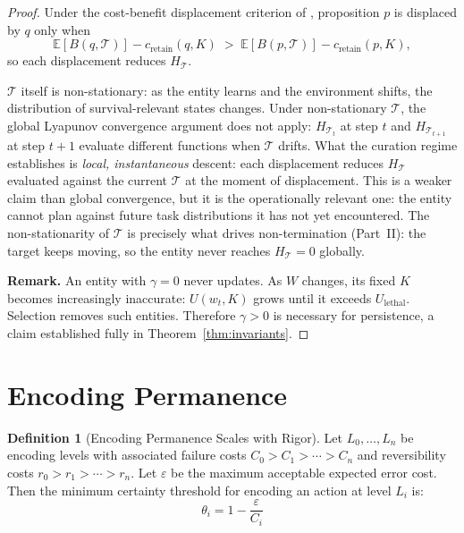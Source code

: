 \documentclass[11pt]{article}
\theoremstyle{definition}
\newtheorem{definition}{Definition}
\theoremstyle{remark}
\begin{document}
\begin{proof}
Under the cost-benefit displacement criterion of \cite{McCarthy2026c},
proposition $p$ is displaced by $q$ only when
\[
  \mathbb{E}[B(q, \mathcal{T})] - c_{\text{retain}}(q, K)
  \;>\;
  \mathbb{E}[B(p, \mathcal{T})] - c_{\text{retain}}(p, K),
\]
so each displacement reduces $H_{\mathcal{T}}$.

$\mathcal{T}$ itself is non-stationary: as the entity learns and the
environment shifts, the distribution of survival-relevant states
changes. Under non-stationary $\mathcal{T}$, the global Lyapunov
convergence argument does not apply: $H_{\mathcal{T}_t}$ at step $t$
and $H_{\mathcal{T}_{t+1}}$ at step $t+1$ evaluate different functions
when $\mathcal{T}$ drifts. What the curation regime establishes is
\emph{local, instantaneous} descent: each displacement reduces
$H_{\mathcal{T}}$ evaluated against the current $\mathcal{T}$ at the
moment of displacement. This is a weaker claim than global
convergence, but it is the operationally relevant one: the entity
cannot plan against future task distributions it has not yet
encountered. The non-stationarity of $\mathcal{T}$ is precisely what
drives non-termination (Part~II): the target keeps moving, so the
entity never reaches $H_{\mathcal{T}} = 0$ globally.

\textbf{Remark.} An entity with $\gamma = 0$ never updates. As $W$
changes, its fixed $K$ becomes increasingly inaccurate: $U(w_t, K)$
grows until it exceeds $U_{\mathrm{lethal}}$. Selection removes such
entities. Therefore $\gamma > 0$ is necessary for persistence, a claim
established fully in Theorem~\ref{thm:invariants}.
\end{proof}

\section{Encoding Permanence}
\label{sec:encoding}

\begin{definition}[Encoding Permanence Scales with Rigor]
\label{def:encoding}
Let $L_0, \ldots, L_n$ be encoding levels with associated failure
costs $C_0 > C_1 > \cdots > C_n$ and reversibility costs
$r_0 > r_1 > \cdots > r_n$. Let $\varepsilon$ be the maximum
acceptable expected error cost. Then the minimum certainty threshold
for encoding an action at level $L_i$ is:
\[
\theta_i = 1 - \frac{\varepsilon}{C_i}
\]
\end{definition}
\end{document}
